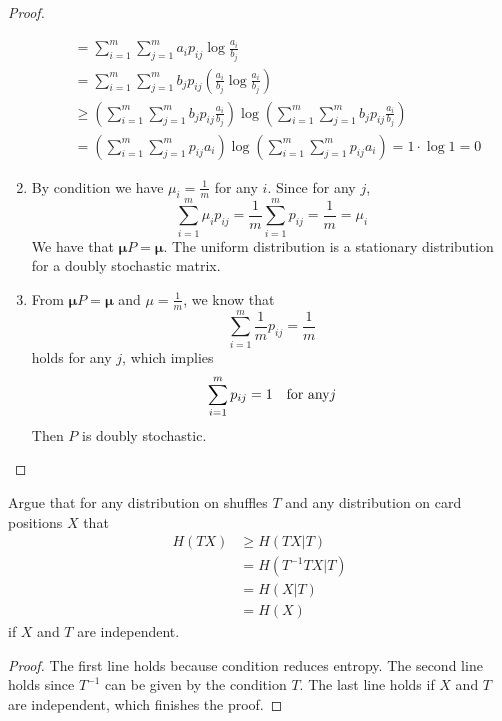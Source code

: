 \begin{exercise}
\begin{proof}
\begin{enumerate}
{\begin{equation}
\begin{aligned}
          &= \sum_{i=1}^{m} \sum_{j=1}^{m} a_i  p_{ij}\log \frac{a_i}{b_j} \\
          &= \sum_{i=1}^{m} \sum_{j=1}^{m} b_j  p_{ij} \left(\frac{a_i}{b_j} \log \frac{a_i}{b_j} \right) \\
          &\ge \left(\sum_{i=1}^{m} \sum_{j=1}^{m} b_j  p_{ij} \frac{a_i}{b_j} \right) \log \left(\sum_{i=1}^{m} \sum_{j=1}^{m} b_j  p_{ij} \frac{a_i}{b_j} \right) \\
          &= \left(\sum_{i=1}^{m} \sum_{j=1}^{m} p_{ij} a_i\right) \log \left(\sum_{i=1}^{m} \sum_{j=1}^{m} p_{ij} a_i\right) = 1 \cdot \log 1 = 0
        \end{aligned}
      \end{equation}
    }
    \item {
     By condition we have $\mu_i = \frac{1}{m}$ for any $i$. Since for any $j$, 
     \begin{equation}
      \sum_{i=1}^{m} \mu_i p_{ij} = \frac{1}{m} \sum_{i=1}^{m} p_{ij} = \frac{1}{m} = \mu_i
     \end{equation}
     We have that $\mathbf{\mu} P = \mathbf{\mu}$. The uniform distribution is a stationary distribution for a doubly stochastic matrix.
    }
    \item {
      From $\mathbf{\mu} P = \mathbf{\mu}$ and $\mu = \frac{1}{m}$, we know that
      \begin{equation}
        \sum_{i=1}^{m} \frac{1}{m} p_{ij} = \frac{1}{m}
       \end{equation}
      holds for any $j$, which implies
      \begin{equation}
        \sum_{i=1}^{m} p_{ij} = 1 \text{\quad for any} j
      \end{equation}
      Then $P$ is doubly stochastic.
    }
  \end{enumerate}
  \end{proof}
  \label{ex8}
\end{exercise}

\begin{exercise}{ Argue that for any distribution on shuffles $T$ and any distribution on card positions $X$ that
  $$
  \begin{aligned}
  H(T X) & \geq H(T X | T) \\
  &=H\left(T^{-1} T X | T\right) \\
  &=H(X | T) \\
  &=H(X)
  \end{aligned}
  $$
  if $X$ and $T$ are independent.}
  \begin{proof} The first line holds because condition reduces entropy. The second line holds since $T^{-1}$ can be given by the condition $T$. The last line holds if $X$ and $T$ are independent, which finishes the proof.
  \end{proof}
  \label{ex9}
\end{exercise}


